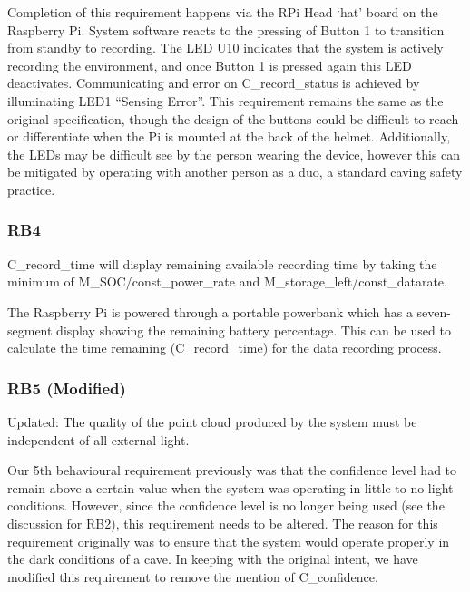 \documentclass[11pt]{article}
\begin{document}
	Completion of this requirement happens via the RPi Head ‘hat’ board on the Raspberry Pi. System software reacts to the pressing of Button 1 to transition from standby to recording. The LED U10 indicates that the system is actively recording the environment, and once Button 1 is pressed again this LED deactivates. Communicating and error on C\_record\_status is achieved by illuminating LED1 “Sensing Error”. This requirement remains the same as the original specification, though the design of the buttons could be difficult to reach or differentiate when the Pi is mounted at the back of the helmet. Additionally, the LEDs may be difficult see by the person wearing the device, however this can be mitigated by operating with another person as a duo, a standard caving safety practice. 
	
	\subsubsection{RB4} 
	
	\begin{exampleblock}
		C\_record\_time will display remaining available recording time by taking the minimum of M\_SOC/const\_power\_rate and M\_storage\_left/const\_datarate.
	\end{exampleblock}
	
	The Raspberry Pi is powered through a portable powerbank which has a seven-segment display showing the remaining battery percentage. This can be used to calculate the time remaining (C\_record\_time) for the data recording process.
	
	\subsubsection{RB5 (Modified)} 
	
	\begin{exampleblock}[orange]
		Updated: The quality of the point cloud produced by the system must be independent of all external light.
	\end{exampleblock}
	
	Our 5th behavioural requirement previously was that the confidence level had to remain above a certain value when the system was operating in little to no light conditions. However, since the confidence level is no longer being used (see the discussion for RB2), this requirement needs to be altered. The reason for this requirement originally was to ensure that the system would operate properly in the dark conditions of a cave. In keeping with the original intent, we have modified this requirement to remove the mention of C\_confidence. 
	
\end{document}
